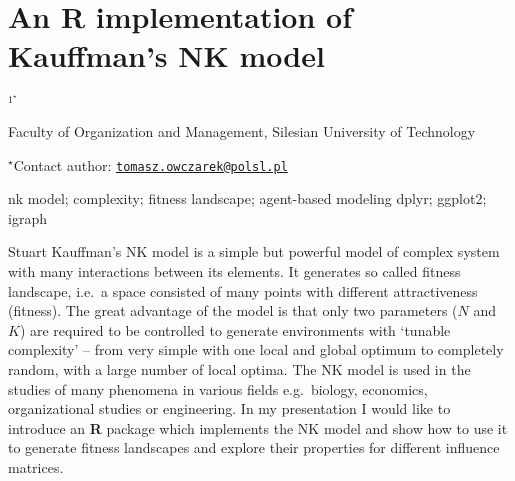 \documentclass[\main/boa.tex]{subfiles}
\begin{document}
\section{An R implementation of Kauffman's NK model}

\begin{center}
  {\bf {}$^{1^\star}$}
\end{center}

\vskip 0.3cm

\begin{affiliations}
\begin{enumerate}
\begin{minipage}{0.915\textwidth}
\centering
\item Faculty of Organization and Management, Silesian University of
Technology \\[-2pt]
\end{minipage}
\end{enumerate}
$^\star$Contact author: \href{mailto:tomasz.owczarek@polsl.pl}{\nolinkurl{tomasz.owczarek@polsl.pl}}\\
\end{affiliations}

\vskip 0.5cm

\begin{minipage}{0.915\textwidth}
\keywords nk model; complexity; fitness landscape; agent-based modeling
\packages dplyr; ggplot2; igraph
\end{minipage}

\vskip 0.8cm

Stuart Kauffman's NK model is a simple but powerful model of complex
system with many interactions between its elements. It generates so
called fitness landscape, i.e.~a space consisted of many points with
different attractiveness (fitness). The great advantage of the model is
that only two parameters (\(N\) and \(K\)) are required to be controlled
to generate environments with `tunable complexity' -- from very simple
with one local and global optimum to completely random, with a large
number of local optima. The NK model is used in the studies of many
phenomena in various fields e.g.~biology, economics, organizational
studies or engineering. In my presentation I would like to introduce an
\textbf{R} package which implements the NK model and show how to use it
to generate fitness landscapes and explore their properties for
different influence matrices.
\end{document}

